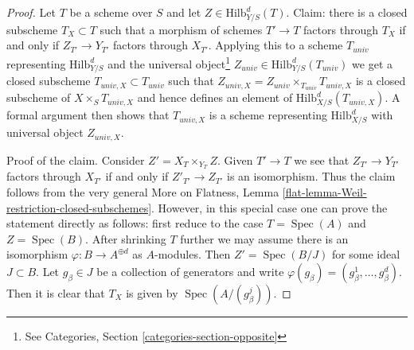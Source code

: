 \documentclass[10pt,a4paper]{amsart}
\theoremstyle{plain}
\theoremstyle{definition}
\theoremstyle{remark}
\numberwithin{equation}{subsection}
\def\Spec{\mathop{\mathrm{Spec}}}
\def\Hilbfunctor{\mathrm{Hilb}}
\begin{document}
\begin{proof}
Let $T$ be a scheme over $S$ and let $Z \in \Hilbfunctor^d_{Y/S}(T)$.
Claim: there is a closed subscheme $T_X \subset T$ such
that a morphism of schemes $T' \to T$ factors through $T_X$ if
and only if $Z_{T'} \to Y_{T'}$ factors through $X_{T'}$.
Applying this to a scheme $T_{univ}$ representing $\Hilbfunctor^d_{Y/S}$ and the
universal object\footnote{See
Categories, Section \ref{categories-section-opposite}}
$Z_{univ} \in \Hilbfunctor^d_{Y/S}(T_{univ})$
we get a closed subscheme $T_{univ, X} \subset T_{univ}$ such that
$Z_{univ, X} = Z_{univ} \times_{T_{univ}} T_{univ, X}$
is a closed subscheme of $X \times_S T_{univ, X}$ and hence
defines an element of $\Hilbfunctor^d_{X/S}(T_{univ, X})$.
A formal argument then shows that $T_{univ, X}$ is a scheme
representing $\Hilbfunctor^d_{X/S}$ with universal object $Z_{univ, X}$.

\medskip\noindent
Proof of the claim. Consider $Z' = X_T \times_{Y_T} Z$. Given $T' \to T$
we see that $Z_{T'} \to Y_{T'}$ factors through $X_{T'}$ if and
only if $Z'_{T'} \to Z_{T'}$ is an isomorphism. Thus the claim follows
from the very general
More on Flatness, Lemma \ref{flat-lemma-Weil-restriction-closed-subschemes}.
However, in this special case one can prove the statement directly as
follows: first reduce to the case $T = \Spec(A)$ and $Z = \Spec(B)$.
After shrinking $T$ further we may assume there is an isomorphism
$\varphi : B \to A^{\oplus d}$ as $A$-modules. Then $Z' = \Spec(B/J)$
for some ideal $J \subset B$. Let $g_\beta \in J$ be a collection of
generators and write $\varphi(g_\beta) = (g_\beta^1, \ldots, g_\beta^d)$.
Then it is clear that $T_X$ is given by $\Spec(A/(g_\beta^j))$.
\end{proof}
\end{document}
